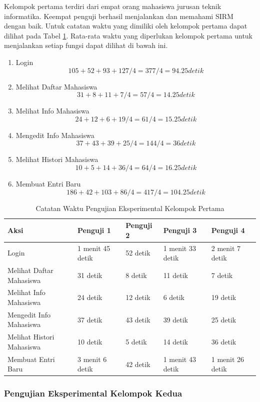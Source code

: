 Kelompok pertama terdiri dari empat orang mahasiswa jurusan teknik informatika.
Keempat penguji berhasil menjalankan dan memahami SIRM dengan baik. Untuk
catatan waktu yang dimiliki oleh kelompok pertama dapat dilihat pada Tabel
\ref{tab:catatanwaktukelompokpertama}. Rata-rata waktu yang diperlukan
kelompok pertama untuk menjalankan setiap fungsi dapat dilihat di bawah ini.
\begin{enumerate}[(1)]
  \item Login
  $$105 + 52 + 93 + 127 / 4 = 377 / 4 = 94.25 detik$$
  \item Melihat Daftar Mahasiswa
  $$31 + 8 + 11 + 7 / 4 = 57 / 4 = 14.25 detik$$
  \item Melihat Info Mahasiswa
  $$24 + 12 + 6 + 19 / 4 = 61 / 4 = 15.25 detik$$
  \item Mengedit Info Mahasiswa
  $$37 + 43 + 39 + 25 / 4 = 144 / 4 = 36 detik$$
  \item Melihat Histori Mahasiswa
  $$10 + 5 + 14 + 36 / 4 = 64 / 4 = 16.25 detik$$
  \item Membuat Entri Baru
  $$186 + 42 + 103 + 86 / 4 = 417 / 4 = 104.25 detik$$
\end{enumerate}

\begin{table}[h]
\centering
\caption[Tabel Catatan Waktu Pengujian Eksperimental Kelompok
Pertama]{Catatan Waktu Pengujian Eksperimental Kelompok Pertama}
\label{tab:catatanwaktukelompokpertama}
\begin{tabular}{|p{3cm}|p{1.8cm}|p{1.8cm}|p{1.8cm}|p{1.8cm}|}
\hline
Aksi & Penguji 1 & Penguji 2 & Penguji 3 & Penguji 4\\
\hline
Login & 1 menit 45 detik & 52 detik & 1 menit 33 detik & 2 menit 7 detik\\
\hline
Melihat Daftar Mahasiswa & 31 detik & 8 detik & 11 detik & 7 detik\\
\hline
Melihat Info Mahasiswa & 24 detik & 12 detik & 6 detik & 19 detik\\
\hline
Mengedit Info Mahasiswa & 37 detik & 43 detik & 39 detik & 25 detik\\
\hline
Melihat Histori Mahasiswa & 10 detik & 5 detik & 14 detik & 36 detik\\
\hline
Membuat Entri Baru & 3 menit 6 detik & 42 detik & 1 menit 43 detik & 1 menit
26 detik\\
\hline
\end{tabular}
\end{table}

\subsubsection{Pengujian Eksperimental Kelompok Kedua}
\label{kelompokkedua}

